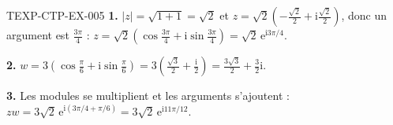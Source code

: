 \begin{corrige}{TEXP-CTP-EX-005}
\textbf{1.} $|z|=\sqrt{1+1}=\sqrt2$ et
$z=\sqrt2\left(-\tfrac{\sqrt2}{2}+\mathrm{i}\tfrac{\sqrt2}{2}\right)$, donc un
argument est $\tfrac{3\pi}{4}$ :
$z=\sqrt2\left(\cos\tfrac{3\pi}{4}+\mathrm{i}\sin\tfrac{3\pi}{4}\right)
=\sqrt2\,\mathrm{e}^{\mathrm{i}3\pi/4}$.

\textbf{2.} $w=3\left(\cos\tfrac{\pi}{6}+\mathrm{i}\sin\tfrac{\pi}{6}\right)
=3\left(\tfrac{\sqrt3}{2}+\tfrac{\mathrm{i}}{2}\right)
=\tfrac{3\sqrt3}{2}+\tfrac{3}{2}\mathrm{i}$.

\textbf{3.} Les modules se multiplient et les arguments s'ajoutent :
$zw=3\sqrt2\,\mathrm{e}^{\mathrm{i}(3\pi/4+\pi/6)}
=3\sqrt2\,\mathrm{e}^{\mathrm{i}11\pi/12}$.
\end{corrige}
